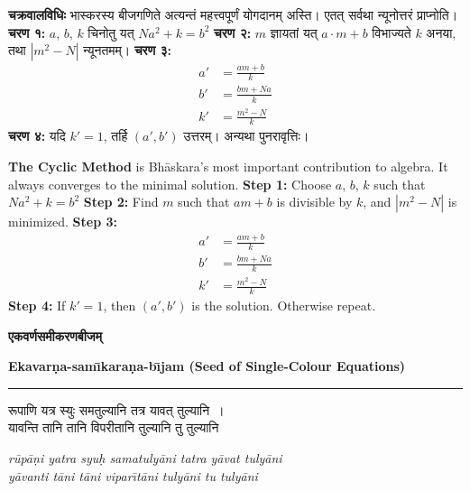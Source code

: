 \documentclass[11pt,a4paper]{article}
\newcommand{\dev}[1]{{\devanagarifont #1}}
\newcommand{\bicol}[2]{%
\noindent%
\begin{minipage}[t]{0.48\textwidth}
\begin{flushleft}
\small
#1
\end{flushleft}
\end{minipage}%
\hfill%
\begin{minipage}[t]{0.48\textwidth}
\begin{flushleft}
\small
#2
\end{flushleft}
\end{minipage}%
\vspace{0.4em}
}
\newcommand{\bicolverse}[2]{%
\par\noindent%
\begin{minipage}[t]{0.48\textwidth}
\centering
\color{versecolor}
\devanagarifont
\small
#1
\end{minipage}%
\hfill%
\begin{minipage}[t]{0.48\textwidth}
\centering
\color{versecolor}
\small
#2
\end{minipage}%
\par\vspace{0.4em}
}
\newcommand{\sectionbicol}[2]{%
\vspace{0.5em}
\noindent%
\begin{minipage}[t]{0.48\textwidth}
\begin{center}
\large\bfseries\color{sectioncolor}
\dev{#1}
\end{center}
\end{minipage}%
\hfill%
\begin{minipage}[t]{0.48\textwidth}
\begin{center}
\large\bfseries\color{sectioncolor}
#2
\end{center}
\end{minipage}%
\vspace{0.3em}
\noindent\rule{\textwidth}{0.4pt}
}
\begin{document}
\bicol{%
\textbf{चक्रवालविधिः} भास्करस्य बीजगणिते अत्यन्तं महत्त्वपूर्णं योगदानम् अस्ति। एतत् सर्वथा न्यूनोत्तरं प्राप्नोति।
\vspace{0.3cm}
\textbf{चरण १:} $a$, $b$, $k$ चिनोतु यत् $Na^2 + k = b^2$
\textbf{चरण २:} $m$ ज्ञायतां यत् $a \cdot m + b$ विभाज्यते $k$ अनया, तथा $|m^2 - N|$ न्यूनतमम्।
\textbf{चरण ३:}
\begin{align*}
a' &= \frac{am + b}{k} \\
b' &= \frac{bm + Na}{k} \\
k' &= \frac{m^2 - N}{k}
\end{align*}
\textbf{चरण ४:} यदि $k' = 1$, तर्हि $(a', b')$ उत्तरम्। अन्यथा पुनरावृत्तिः।
}{%
\textbf{The Cyclic Method} is Bh\={a}skara's most important contribution to algebra. It always converges to the minimal solution.
\vspace{0.3cm}
\textbf{Step 1:} Choose $a$, $b$, $k$ such that $Na^2 + k = b^2$
\textbf{Step 2:} Find $m$ such that $am + b$ is divisible by $k$, and $|m^2 - N|$ is minimized.
\textbf{Step 3:}
\begin{align*}
a' &= \frac{am + b}{k} \\
b' &= \frac{bm + Na}{k} \\
k' &= \frac{m^2 - N}{k}
\end{align*}
\textbf{Step 4:} If $k' = 1$, then $(a', b')$ is the solution. Otherwise repeat.
}

\clearpage

\sectionbicol{एकवर्णसमीकरणबीजम्}{Ekavar\d{n}a-sam\={\i}kara\d{n}a-b\={\i}jam (Seed of Single-Colour Equations)}

\vspace{0.3cm}

\bicolverse{%
रूपाणि यत्र स्युः समतुल्यानि तत्र यावत् तुल्यानि~।\\
यावन्ति तानि तानि विपरीतानि तुल्यानि तु तुल्यानि~
}{%
\textit{r\={u}p\={a}\d{n}i yatra syu\d{h} samatuly\={a}ni tatra y\={a}vat tuly\={a}ni}\\
\textit{y\={a}vanti t\={a}ni t\={a}ni vipar\={\i}t\={a}ni tuly\={a}ni tu tuly\={a}ni}
}

\vspace{0.5cm}
\end{document}
